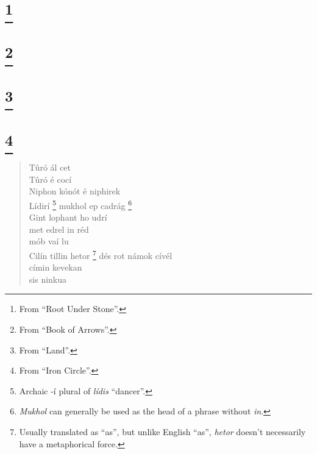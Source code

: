 \documentclass{article}
\let\oldthefootnote\thefootnote
\newcommand\oocfootnote[2][DarkGreen]{\renewcommand\thefootnote{\color{#1}\oldthefootnote}%
  \footnote{\color{#1}#2}%
  \renewcommand{\thefootnote}{\oldthefootnote}}
\begin{document}

\begin{verse}
\end{verse}


\section{\oocfootnote{From ``Root Under Stone''.}}


\begin{verse}
\end{verse}


\section{\oocfootnote{From ``Book of Arrows''.}}


\begin{verse}
\end{verse}


\section{\oocfootnote{From ``Land''.}}


\begin{verse}
\end{verse}


\section{\oocfootnote{From ``Iron Circle''.}}


\begin{verse}


Tûró ál cet \\
Tûró é cocí \\
Niphon kónót é niphirek \\
Lídirí\oocfootnote{Archaic -í plural of \emph{lídis} ``dancer''.} mukhol ep cadrág\oocfootnote{\emph{Mukhol} can generally be used as the head of a phrase without \emph{in}.} \\
Gint lophant ho udrí \\
\hspace{1em} met edrel in réd \\
\hspace{1em} mób vaí lu \\
Cilín tillin hetor\oocfootnote{Usually translated as ``as'', but unlike English ``as'', \emph{hetor} doesn't necessarily have a metaphorical force.} dés rot námok cívél \\
\hspace{1em} címin kevekan \\
\hspace{1em} sis ninkua

\end{verse}
\end{document}
